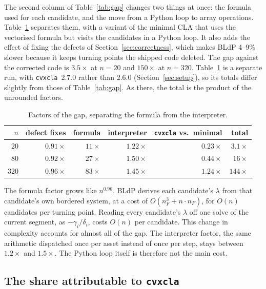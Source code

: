 \documentclass[11pt,a4paper]{article}
\newcommand{\code}[1]{\texttt{#1}}
\newcommand{\cvxcla}{\code{cvxcla}}
\begin{document}
The second column of Table~\ref{tab:gap} changes two things at once: the
formula used for each candidate, and the move from a Python loop to array
operations. Table~\ref{tab:fair} separates them, with a variant of the minimal
CLA that uses the vectorised formula but visits the candidates in a Python
loop. It also adds the effect of fixing the defects of
Section~\ref{sec:correctness}, which makes BLdP 4--9\% slower because it keeps
turning points the shipped code deleted. The gap against the corrected code is
$3.5\times$ at $n = 20$ and $150\times$ at $n = 320$. Table~\ref{tab:fair} is a
separate run, with \cvxcla{}~2.7.0 rather than 2.6.0
(Section~\ref{sec:setup}), so its totals differ slightly from those of
Table~\ref{tab:gap}. As there, the total is the product of the unrounded factors.

\begin{table}[ht]
  \centering
  \small
  \caption{Factors of the gap, separating the formula from the
    interpreter.}\label{tab:fair}
  \begin{tabular}{rrrrrr}
    \toprule
    $n$ & defect fixes & formula & interpreter & \cvxcla{} vs.\ minimal & total \\
    \midrule
    20  & $0.91\times$ & $11\times$ & $1.22\times$ & $0.23\times$ & $3.1\times$ \\
    80  & $0.92\times$ & $27\times$ & $1.50\times$ & $0.44\times$ & $16\times$  \\
    320 & $0.96\times$ & $83\times$ & $1.45\times$ & $1.24\times$ & $144\times$ \\
    \bottomrule
  \end{tabular}
\end{table}

The formula factor grows like $n^{0.96}$. BLdP derives each candidate's
$\lambda$ from that candidate's own bordered system, at a cost of
$O(n_F^3 + n \cdot n_F)$, for $O(n)$ candidates per turning point. Reading
every candidate's $\lambda$ off one solve of the current segment, as
$-\gamma_i/\delta_i$, costs $O(n)$ per candidate. This change in complexity
accounts for almost all of the gap. The interpreter factor, the same
arithmetic dispatched once per asset instead of once per step, stays between
$1.2\times$ and $1.5\times$. The Python loop itself is therefore not the main
cost.

\subsection{The share attributable to \cvxcla{}}
\end{document}
